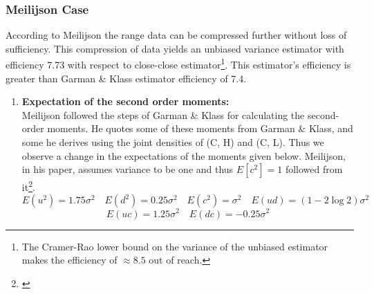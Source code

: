 \documentclass[12pt]{article}   	%
\begin{document}
\subsubsection{Meilijson Case}
According to Meilijson the range data can be compressed further without loss of sufficiency. This compression of data yields an unbiased variance estimator with efficiency 7.73 with respect to close-close estimator\footnote{The Cramer-Rao lower bound on the variance of the unbiased estimator makes the efficiency of $\approx 8.5$ out of reach.}. This estimator's efficiency is greater than Garman \& Klass estimator efficiency of 7.4.
\begin{enumerate}

\item \textbf{Expectation of the second order moments:}\\
Meilijson followed the steps of Garman \& Klass for calculating the second-order moments. He quotes some of these moments from Garman \& Klass, and some he derives using the joint densities of (C, H) and (C, L). Thus we observe a change in the expectations of the moments given below. Meilijson, in his paper, assumes variance to be one and thus $E[c^2]=1$ followed from it\footnote{\citealp{meilijson2008}}.
$$ E(u^2 )=1.75\sigma^2\quad  E(d^2 )=0.25\sigma^2\quad  E(c^2 )=\sigma^2\quad E(ud)=(1-2\log 2)\sigma{^2} \quad $$
$$E(uc )=1.25\sigma^2\quad E(dc)=-0.25\sigma^2 $$


\end{enumerate}
\end{document}
